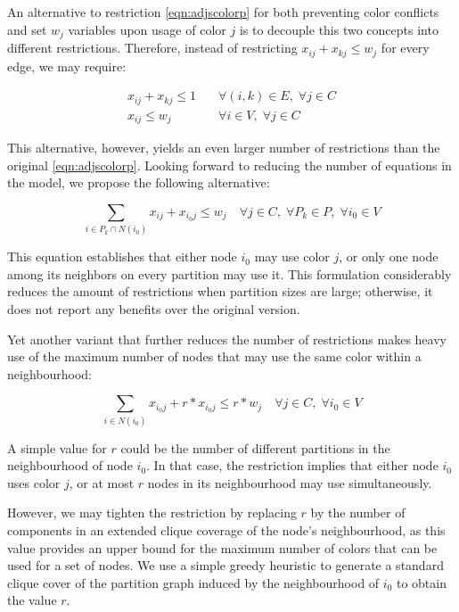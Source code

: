 An alternative to restriction \ref{eqn:adjscolorp} for both preventing color conflicts and set $w_j$ variables upon usage of color $j$ is to decouple this two concepts into different restrictions. Therefore, instead of restricting $x_{ij} + x_{kj} \leq w_j$ for every edge, we may require:

\begin{align}
x_{ij} + x_{kj} \leq 1 \quad &\forall (i,k) \in E, \; \forall j \in C \label{eqn:adjscolorpone}\\
x_{ij} \leq w_{j} \quad &\forall i \in V, \; \forall j \in C \label{eqn:nodelessthanwj}
\end{align}

This alternative, however, yields an even larger number of restrictions than the original \ref{eqn:adjscolorp}. Looking forward to reducing the number of equations in the model, we propose the following alternative:

\begin{equation}
\label{eqn:adjsperpart}
\sum_{i \in P_k \cap N(i_0)} x_{ij} + x_{i_0j} \leq w_j \quad \forall j \in C, \; \forall P_k \in P, \; \forall i_0 \in V 
\end{equation}

This equation establishes that either node $i_0$ may use color $j$, or only one node among its neighbors on every partition may use it. This formulation considerably reduces the amount of restrictions when partition sizes are large; otherwise, it does not report any benefits over the original version.

Yet another variant that further reduces the number of restrictions makes heavy use of the maximum number of nodes that may use the same color within a neighbourhood:

\begin{equation}
\label{eqn:adjsneighb}
\sum_{i \in N(i_0)} x_{i_0j} + r * x_{i_0j} \leq r * w_j \quad \forall j \in C, \; \forall i_0 \in V 
\end{equation}

A simple value for $r$ could be the number of different partitions in the neighbourhood of node $i_0$. In that case, the restriction implies that either node $i_0$ uses color $j$, or at most $r$ nodes in its neighbourhood may use simultaneously.

However, we may tighten the restriction by replacing $r$ by the number of components in an extended clique coverage of the node's neighbourhood, as this value provides an upper bound for the maximum number of colors that can be used for a set of nodes. We use a simple greedy heuristic to generate a standard clique cover of the partition graph induced by the neighbourhood of $i_0$ to obtain the value $r$.

